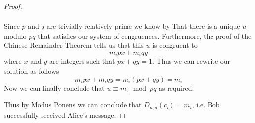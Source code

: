 \begin{definition}
\begin{proof}
\begin{itemize}
\begin{align*}
                        \end{align*}
                        Since $p$ and $q$ are trivially relatively prime we know by
                         That there is a unique $u$ modulo
                        $pq$ that satisfies our system of congruences. Furthermore, the proof
                        of the Chinese Remainder Theorem tells us that this $u$ is congruent to
                        \[
                            m_ipx + m_iqy
                        \]
                        where $x$ and $y$ are integers such that $px + qy = 1$. Thus we can
                        rewrite our solution as follows
                        \[
                            m_ipx + m_iqy = m_i(px + qy) = m_i
                        \]
                        Now we can finally conclude that $u \equiv m_i \mod pq$ as required. \QED
                \end{itemize}
                Thus by Modus Ponens we can conclude that $D_{n, d}(c_i) = m_i$, i.e. Bob successfully
                received Alice's message. \QED
            \end{proof}
        \end{definition}

